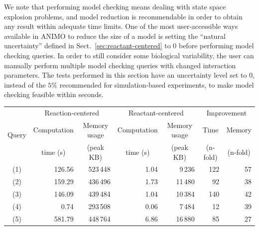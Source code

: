 \documentclass{llncs}
\begin{document}
We note that performing model checking means dealing with state space explosion problems,
and model reduction is recommendable in order to obtain any result within adequate time limits. One of the
most user-accessible ways available in ANIMO to reduce the size of a model is setting the ``natural uncertainty''
defined in Sect.~\ref{sec:reactant-centered} to 0 before performing model checking queries.
In order to still consider some biological variability, the user can manually perform multiple model checking queries with changed interaction parameters.
The tests performed in this section have an uncertainty level set to 0, instead of the $5\%$ recommended for simulation-based experiments, to
make model checking feasible within seconds.


\begin{table}[htbp]
  \begin{center}
    \begin{tabular}{|c||r|r||r|r||r|r|}
      \hline
       \multirow{3}{*}{Query} & \multicolumn{2}{c||}{Reaction-centered}	   & \multicolumn{2}{c||}{Reactant-centered} & \multicolumn{2}{c|}{Improvement}\\
      \cline{2-7}
       & \multicolumn{1}{c|}{Computation} & \multicolumn{1}{c||}{Memory usage} & \multicolumn{1}{c|}{Computation} & \multicolumn{1}{c||}{Memory usage} & \multicolumn{1}{c|}{Time} & \multicolumn{1}{c|}{Memory} \\
       & \multicolumn{1}{c|}{time (s)}    & \multicolumn{1}{c||}{(peak KB)}    & \multicolumn{1}{c|}{time (s)} & \multicolumn{1}{c||}{(peak KB)} & \multicolumn{1}{c|}{(n-fold)} & \multicolumn{1}{c|}{(n-fold)}\\
      \hline
      \hline
      (1) & 126.56 & 523\,{}448 & 1.04 & 9\,{}236 & 122 & 57 \\ %
      \hline
      (2) & 159.29 & 436\,{}496 & 1.73 & 11\,{}480 & 92 & 38 \\ %
      \hline
      (3) & 146.09 & 439\,{}484 & 1.04 & 10\,{}384 & 140 & 42 \\ %
      \hline
      (4) & 0.74 & 293\,{}508 & 0.06 & 7\,{}484 & 12 & 39 \\ %
      \hline
      (5) & 581.79 & 448\,{}764 & 6.86 & 16\,{}880 & 85 & 27 \\ %

\end{tabular}
\end{center}
\end{table}
\end{document}
